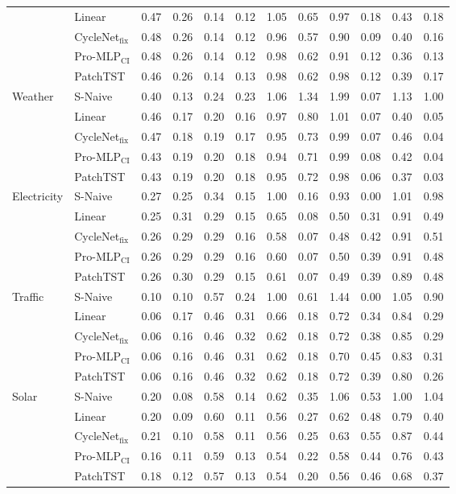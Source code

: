 \begin{tabular}{llcccccccccc}
 & Linear & 0.47 & 0.26 & 0.14 & 0.12 & 1.05 & 0.65 & 0.97 & 0.18 & 0.43 & 0.18 \\
 & CycleNet$_{\text{fix}}$ & 0.48 & 0.26 & 0.14 & 0.12 & 0.96 & 0.57 & 0.90 & 0.09 & 0.40 & 0.16 \\
 & Pro-MLP$_{\text{CI}}$ & 0.48 & 0.26 & 0.14 & 0.12 & 0.98 & 0.62 & 0.91 & 0.12 & 0.36 & 0.13 \\
 & PatchTST & 0.46 & 0.26 & 0.14 & 0.13 & 0.98 & 0.62 & 0.98 & 0.12 & 0.39 & 0.17 \\
\midrule
\multirow{5}{*}{Weather} & S-Naive & 0.40 & 0.13 & 0.24 & 0.23 & 1.06 & 1.34 & 1.99 & 0.07 & 1.13 & 1.00 \\
 & Linear & 0.46 & 0.17 & 0.20 & 0.16 & 0.97 & 0.80 & 1.01 & 0.07 & 0.40 & 0.05 \\
 & CycleNet$_{\text{fix}}$ & 0.47 & 0.18 & 0.19 & 0.17 & 0.95 & 0.73 & 0.99 & 0.07 & 0.46 & 0.04 \\
 & Pro-MLP$_{\text{CI}}$ & 0.43 & 0.19 & 0.20 & 0.18 & 0.94 & 0.71 & 0.99 & 0.08 & 0.42 & 0.04 \\
 & PatchTST & 0.43 & 0.19 & 0.20 & 0.18 & 0.95 & 0.72 & 0.98 & 0.06 & 0.37 & 0.03 \\
\midrule
\multirow{5}{*}{Electricity} & S-Naive & 0.27 & 0.25 & 0.34 & 0.15 & 1.00 & 0.16 & 0.93 & 0.00 & 1.01 & 0.98 \\
 & Linear & 0.25 & 0.31 & 0.29 & 0.15 & 0.65 & 0.08 & 0.50 & 0.31 & 0.91 & 0.49 \\
 & CycleNet$_{\text{fix}}$ & 0.26 & 0.29 & 0.29 & 0.16 & 0.58 & 0.07 & 0.48 & 0.42 & 0.91 & 0.51 \\
 & Pro-MLP$_{\text{CI}}$ & 0.26 & 0.29 & 0.29 & 0.16 & 0.60 & 0.07 & 0.50 & 0.39 & 0.91 & 0.48 \\
 & PatchTST & 0.26 & 0.30 & 0.29 & 0.15 & 0.61 & 0.07 & 0.49 & 0.39 & 0.89 & 0.48 \\
\midrule
\multirow{5}{*}{Traffic} & S-Naive & 0.10 & 0.10 & 0.57 & 0.24 & 1.00 & 0.61 & 1.44 & 0.00 & 1.05 & 0.90 \\
 & Linear & 0.06 & 0.17 & 0.46 & 0.31 & 0.66 & 0.18 & 0.72 & 0.34 & 0.84 & 0.29 \\
 & CycleNet$_{\text{fix}}$ & 0.06 & 0.16 & 0.46 & 0.32 & 0.62 & 0.18 & 0.72 & 0.38 & 0.85 & 0.29 \\
 & Pro-MLP$_{\text{CI}}$ & 0.06 & 0.16 & 0.46 & 0.31 & 0.62 & 0.18 & 0.70 & 0.45 & 0.83 & 0.31 \\
 & PatchTST & 0.06 & 0.16 & 0.46 & 0.32 & 0.62 & 0.18 & 0.72 & 0.39 & 0.80 & 0.26 \\
\midrule
\multirow{5}{*}{Solar} & S-Naive & 0.20 & 0.08 & 0.58 & 0.14 & 0.62 & 0.35 & 1.06 & 0.53 & 1.00 & 1.04 \\
 & Linear & 0.20 & 0.09 & 0.60 & 0.11 & 0.56 & 0.27 & 0.62 & 0.48 & 0.79 & 0.40 \\
 & CycleNet$_{\text{fix}}$ & 0.21 & 0.10 & 0.58 & 0.11 & 0.56 & 0.25 & 0.63 & 0.55 & 0.87 & 0.44 \\
 & Pro-MLP$_{\text{CI}}$ & 0.16 & 0.11 & 0.59 & 0.13 & 0.54 & 0.22 & 0.58 & 0.44 & 0.76 & 0.43 \\
 & PatchTST & 0.18 & 0.12 & 0.57 & 0.13 & 0.54 & 0.20 & 0.56 & 0.46 & 0.68 & 0.37 \\
\bottomrule
\end{tabular}
